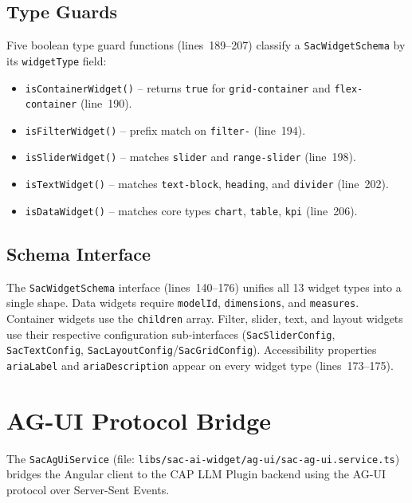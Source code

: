 \documentclass[11pt]{article}
\begin{document}
\subsection{Type Guards}

Five boolean type guard functions (lines~189--207) classify a
\texttt{SacWidgetSchema} by its \texttt{widgetType} field:

\begin{itemize}
  \item \texttt{isContainerWidget()} -- returns \texttt{true} for
        \texttt{grid-container} and \texttt{flex-container} (line~190).
  \item \texttt{isFilterWidget()} -- prefix match on \texttt{filter-}
        (line~194).
  \item \texttt{isSliderWidget()} -- matches \texttt{slider} and
        \texttt{range-slider} (line~198).
  \item \texttt{isTextWidget()} -- matches \texttt{text-block},
        \texttt{heading}, and \texttt{divider} (line~202).
  \item \texttt{isDataWidget()} -- matches core types \texttt{chart},
        \texttt{table}, \texttt{kpi} (line~206).
\end{itemize}

\subsection{Schema Interface}

The \texttt{SacWidgetSchema} interface (lines~140--176) unifies all 13 widget
types into a single shape. Data widgets require \texttt{modelId},
\texttt{dimensions}, and \texttt{measures}. Container widgets use the
\texttt{children} array. Filter, slider, text, and layout widgets use their
respective configuration sub-interfaces (\texttt{SacSliderConfig},
\texttt{SacTextConfig}, \texttt{SacLayoutConfig}/\texttt{SacGridConfig}).
Accessibility properties \texttt{ariaLabel} and \texttt{ariaDescription} appear
on every widget type (lines~173--175).

\section{AG-UI Protocol Bridge}
\label{sec:agui}

The \texttt{SacAgUiService} (file:
\texttt{libs/sac-ai-widget/ag-ui/sac-ag-ui.service.ts}) bridges the Angular
client to the CAP LLM Plugin backend using the AG-UI protocol over Server-Sent
Events.
\end{document}
